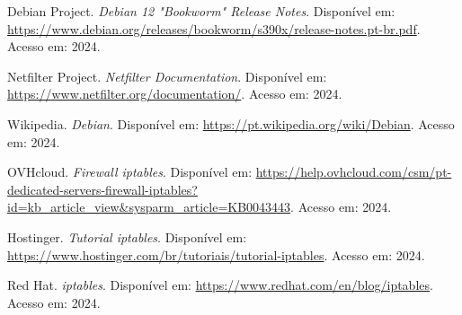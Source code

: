 ﻿\documentclass[12pt,fleqn]{article}
\begin{document}
\begin{thebibliography}{99}

Debian Project. \textit{Debian 12 "Bookworm" Release Notes}. Disponível em: \url{https://www.debian.org/releases/bookworm/s390x/release-notes.pt-br.pdf}. Acesso em: 2024.

Netfilter Project. \textit{Netfilter Documentation}. Disponível em: \url{https://www.netfilter.org/documentation/}. Acesso em: 2024.

Wikipedia. \textit{Debian}. Disponível em: \url{https://pt.wikipedia.org/wiki/Debian}. Acesso em: 2024.

OVHcloud. \textit{Firewall iptables}. Disponível em: \url{https://help.ovhcloud.com/csm/pt-dedicated-servers-firewall-iptables?id=kb_article_view&sysparm_article=KB0043443}. Acesso em: 2024.

Hostinger. \textit{Tutorial iptables}. Disponível em: \url{https://www.hostinger.com/br/tutoriais/tutorial-iptables}. Acesso em: 2024.

Red Hat. \textit{iptables}. Disponível em: \url{https://www.redhat.com/en/blog/iptables}. Acesso em: 2024.

\end{thebibliography}


\end{document}
